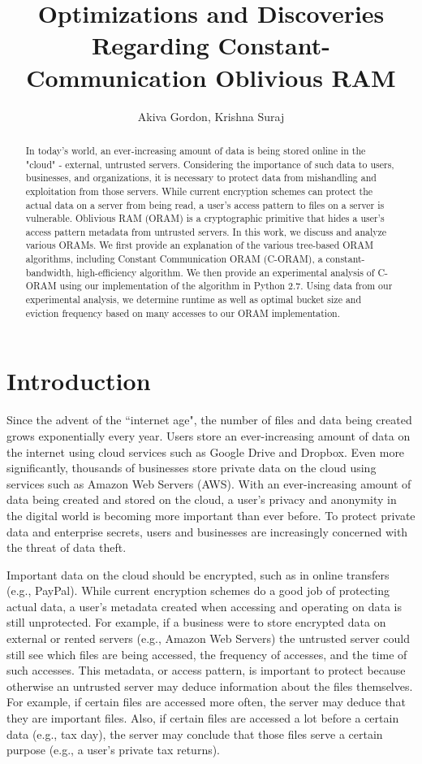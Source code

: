 \documentclass[12pt, oneside]{article}   	%
\title{Optimizations and Discoveries Regarding Constant-Communication Oblivious RAM}
\author{Akiva Gordon, Krishna Suraj}
\date{}							%
\begin{document}
\maketitle

\begin{abstract}
In today's world, an ever-increasing amount of data is being stored online in the "cloud" - external, untrusted servers. Considering the importance of such data to users, businesses, and organizations, it is necessary to protect data from mishandling and exploitation from those servers. While current encryption schemes can protect the actual data on a server from being read, a user's access pattern to files on a server is vulnerable. Oblivious RAM (ORAM) is a cryptographic primitive that hides a user's access pattern metadata from untrusted servers. In this work, we discuss and analyze various ORAMs. We first provide an explanation of the various tree-based ORAM algorithms, including Constant Communication ORAM (C-ORAM), a constant-bandwidth, high-efficiency algorithm. We then provide an experimental analysis of C-ORAM using our implementation of the algorithm in Python 2.7. Using data from our experimental analysis, we determine runtime as well as  optimal bucket size and eviction frequency based on many accesses to our ORAM implementation.

\end{abstract}


\section{Introduction}
Since the advent of the ``internet age", the number of files and data being created grows exponentially every year. Users store an ever-increasing amount of data on the internet using cloud services such as Google Drive and Dropbox. Even more significantly, thousands of businesses store private data on the cloud using services such as Amazon Web Servers (AWS). With an ever-increasing amount of data being created and stored on the cloud, a user's privacy and anonymity in the digital world is becoming more important than ever before. To protect private data and enterprise secrets, users and businesses are increasingly concerned with the threat of data theft.

Important data on the cloud should be encrypted, such as in online transfers (e.g., PayPal). While current encryption schemes do a good job of protecting actual data, a user's metadata created when accessing and operating on data is still unprotected. For example, if a business were to store encrypted data on external or rented servers (e.g., Amazon Web Servers) the untrusted server could still see which files are being accessed, the frequency of accesses, and the time of such accesses. This metadata, or access pattern, is important to protect because otherwise an untrusted server may deduce information about the files themselves. For example, if certain files are accessed more often, the server may deduce that they are important files. Also, if certain files are accessed a lot before a certain data (e.g., tax day), the server may conclude that those files serve a certain purpose (e.g., a user's private tax returns).
\end{document}

